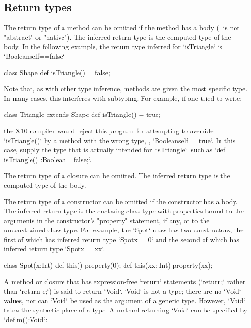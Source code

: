{

\subsection{Return types}

The return type of a method can be omitted if the method has a body (\ie, is
not \xcd"abstract" or \xcd"native"). The inferred return type is the computed
type of the body.  In the following example, the return type inferred for
\xcd`isTriangle` is 
\xcd`Boolean{self==false}`
\begin{xten}
class Shape {
  def isTriangle() = false; 
}  
\end{xten}
%
Note that, as with other type inference, methods are given the most specific
type.  In many cases, this interferes with subtyping.  For example, if one
tried to write: 
\begin{xten}
class Triangle extends Shape {
  def isTriangle() = true;
}
\end{xten}
\noindent
the X10 compiler would reject this program for attempting to override
\xcd`isTriangle()` by a method with the wrong type, \viz,
\xcd`Boolean{self==true}`.  In this case, supply the type that is actually
intended for \xcd`isTriangle`, such as 
\xcd`def isTriangle() :Boolean =false;`. 

The return type of a closure can be omitted.
The inferred return type is the computed type of the body.

The return type of a constructor can be omitted if the
constructor has a body.
The inferred return type is the enclosing class type with
properties bound to the arguments in the constructor's \xcd"property"
statement, if any, or to the unconstrained class type.
For example, the \xcd`Spot` class has two constructors, the first of which has
inferred return type \xcd`Spot{x==0}` and the second of which has 
inferred return type \xcd`Spot{x==xx}`. 
\begin{xten}
class Spot(x:Int) {
  def this() {property(0);}
  def this(xx: Int) { property(xx); }
}
\end{xten}



A method or closure that has expression-free \xcd`return` statements
(\xcd`return;` rather than \xcd`return e;`) is said to return \xcd`Void`.
\xcd`Void` is not a type; there are no \xcd`Void` values, nor can \xcd`Void`
be used as the argument of a generic type. However, \xcd`Void` takes the
syntactic place of a type. A method returning \xcd`Void` can be specified by
\xcd`def m():Void`: 

}
